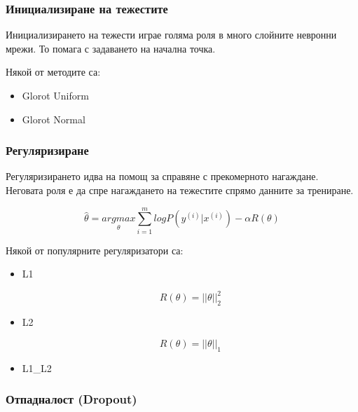 \documentclass{article}
\begin{document}
    \subsubsection{Инициализиране на тежестите}

    Инициализирането на тежести играе голяма роля в много слойните невронни мрежи. То помага с задаването на начална точка.

    Някой от методите са:

    \begin{itemize}
        \item Glorot Uniform
        \item Glorot Normal
    \end{itemize}

    \subsubsection{Регуляризиране}

    Регуляризирането идва на помощ за справяне с прекомерното нагаждане. Неговата роля е да спре нагаждането на тежестите
    спрямо данните за трениране.

    \begin{equation}
        \hat{\theta} = \underset{\theta}{argmax} \sum_{i=1}^m log P(y^{(i)}|x^{(i)}) - \alpha R(\theta)
    \end{equation}

    Някой от популярните регуляризатори са:

    \begin{itemize}
        \item L1

        \begin{equation}
            R(\theta) = ||\theta||_2^2
        \end{equation}

        \item L2

        \begin{equation}
            R(\theta) = ||\theta||_1
        \end{equation}

        \item L1\_L2
    \end{itemize}

    \subsubsection{Отпадналост (Dropout)}
\end{document}
